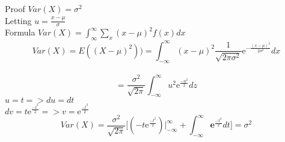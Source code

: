 \documentclass{article}
\begin{document}
Proof $Var(X) = \sigma ^2$\\
Letting $u = \frac{x-\mu}{\sigma}$\\
Formula $Var(X) = \int_\infty^\infty \sum_{x}(x- \mu)^2 f(x) dx$
$$Var(X) = E((X - \mu)^2)) =\int_{-\infty}^\infty (x-\mu)^2 \frac{1}{\sqrt{2\pi\sigma^2}} \mathrm{e}^{-\frac{(x-\mu)^2}{2\sigma^2}} dx $$\\
$$       = \frac{\sigma^2}{\sqrt{2 \pi}} \int_{-\infty}^\infty u^2 \mathrm{e}^{\frac{-u^2}{2}} dz $$
$u = t  =>   du = dt$\\
$dv = t\mathrm{e}^{\frac{-t^2}{2}} =>    v = \mathrm{e}^{\frac{-t^2}{2}}$
$$ Var(X) = \frac{\sigma^2}{\sqrt{2 \pi}} \big[(-t \mathrm{e}^{\frac{-t^2}{2}})\big|_{-\infty}^{\infty} + \int_{-\infty}^{\infty} \mathbf{e}^{\frac{-t^2}{2}} dt \big] = \sigma ^2$$
\end{document}
